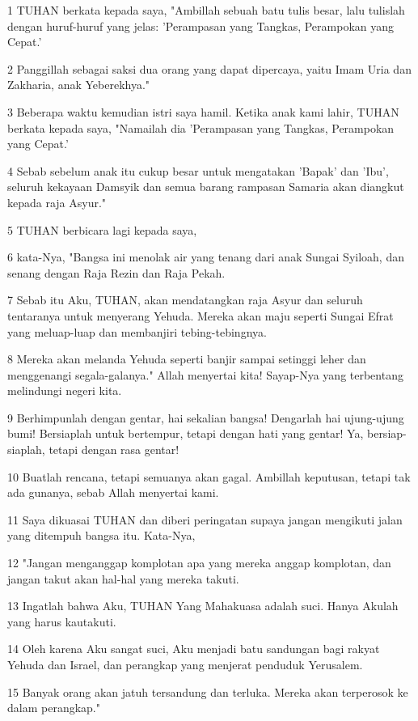 \par 1 TUHAN berkata kepada saya, "Ambillah sebuah batu tulis besar, lalu tulislah dengan huruf-huruf yang jelas: 'Perampasan yang Tangkas, Perampokan yang Cepat.'
\par 2 Panggillah sebagai saksi dua orang yang dapat dipercaya, yaitu Imam Uria dan Zakharia, anak Yeberekhya."
\par 3 Beberapa waktu kemudian istri saya hamil. Ketika anak kami lahir, TUHAN berkata kepada saya, "Namailah dia 'Perampasan yang Tangkas, Perampokan yang Cepat.'
\par 4 Sebab sebelum anak itu cukup besar untuk mengatakan 'Bapak' dan 'Ibu', seluruh kekayaan Damsyik dan semua barang rampasan Samaria akan diangkut kepada raja Asyur."
\par 5 TUHAN berbicara lagi kepada saya,
\par 6 kata-Nya, "Bangsa ini menolak air yang tenang dari anak Sungai Syiloah, dan senang dengan Raja Rezin dan Raja Pekah.
\par 7 Sebab itu Aku, TUHAN, akan mendatangkan raja Asyur dan seluruh tentaranya untuk menyerang Yehuda. Mereka akan maju seperti Sungai Efrat yang meluap-luap dan membanjiri tebing-tebingnya.
\par 8 Mereka akan melanda Yehuda seperti banjir sampai setinggi leher dan menggenangi segala-galanya." Allah menyertai kita! Sayap-Nya yang terbentang melindungi negeri kita.
\par 9 Berhimpunlah dengan gentar, hai sekalian bangsa! Dengarlah hai ujung-ujung bumi! Bersiaplah untuk bertempur, tetapi dengan hati yang gentar! Ya, bersiap-siaplah, tetapi dengan rasa gentar!
\par 10 Buatlah rencana, tetapi semuanya akan gagal. Ambillah keputusan, tetapi tak ada gunanya, sebab Allah menyertai kami.
\par 11 Saya dikuasai TUHAN dan diberi peringatan supaya jangan mengikuti jalan yang ditempuh bangsa itu. Kata-Nya,
\par 12 "Jangan menganggap komplotan apa yang mereka anggap komplotan, dan jangan takut akan hal-hal yang mereka takuti.
\par 13 Ingatlah bahwa Aku, TUHAN Yang Mahakuasa adalah suci. Hanya Akulah yang harus kautakuti.
\par 14 Oleh karena Aku sangat suci, Aku menjadi batu sandungan bagi rakyat Yehuda dan Israel, dan perangkap yang menjerat penduduk Yerusalem.
\par 15 Banyak orang akan jatuh tersandung dan terluka. Mereka akan terperosok ke dalam perangkap."

